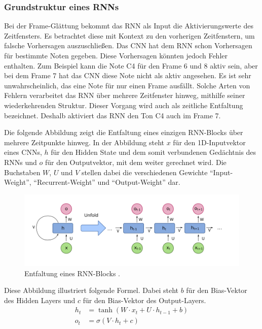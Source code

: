 \subsubsection{Grundstruktur eines RNNs}
Bei der Frame-Glättung bekommt das RNN als Input die Aktivierungswerte des Zeitfensters.
Es betrachtet diese mit Kontext zu den vorherigen Zeitfenstern, um falsche Vorhersagen auszuschließen.
Das CNN hat dem RNN schon Vorhersagen für bestimmte Noten gegeben.
Diese Vorhersagen könnten jedoch Fehler enthalten.
Zum Beispiel kann die Note C4 für den Frame 6 und 8 aktiv sein,
aber bei dem Frame 7 hat das CNN diese Note nicht als aktiv angesehen.
Es ist sehr unwahrscheinlich, das eine Note für nur einen Frame ausfällt.
Solche Arten von Fehlern verarbeitet das RNN über mehrere Zeitfenster hinweg, mithilfe seiner wiederkehrenden Struktur.
Dieser Vorgang wird auch als zeitliche Entfaltung bezeichnet.
Deshalb aktiviert das RNN den Ton C4 auch im Frame 7.

Die folgende Abbildung zeigt die Entfaltung eines einzigen RNN-Blocks über mehrere Zeitpunkte hinweg.
In der Abbildung steht $x$ für den 1D-Inputvektor eines CNNs,
$h$ für den Hidden State und dem somit verbundenen Gedächtnis des RNNs
und $o$ für den Outputvektor, mit dem weiter gerechnet wird.
Die Buchstaben $W$, $U$ und $V$ stellen dabei die verschiedenen
Gewichte \enquote{Input-Weight}, \enquote{Recurrent-Weight} und \enquote{Output-Weight} dar.
\begin{figure}[H]
    \centering
    \includegraphics[width=1\textwidth]{Graphics/rnn_unfold}
    \caption[Entfaltung eines RNN-Blocks]{Entfaltung eines RNN-Blocks  \cite{wikimediaRNN}.}
    \label{fig:rnn_block_unfold}
\end{figure}
Diese Abbildung illustriert folgende Formel.
Dabei steht $b$ für den Bias-Vektor des Hidden Layers und $c$ für den Bias-Vektor des Output-Layers.
\begin{align*}
h_t &= \tanh\left( W \cdot x_t + U \cdot h_{t-1} + b \right) \\
o_t &= \sigma\left( V \cdot h_t + c \right)
\end{align*}

